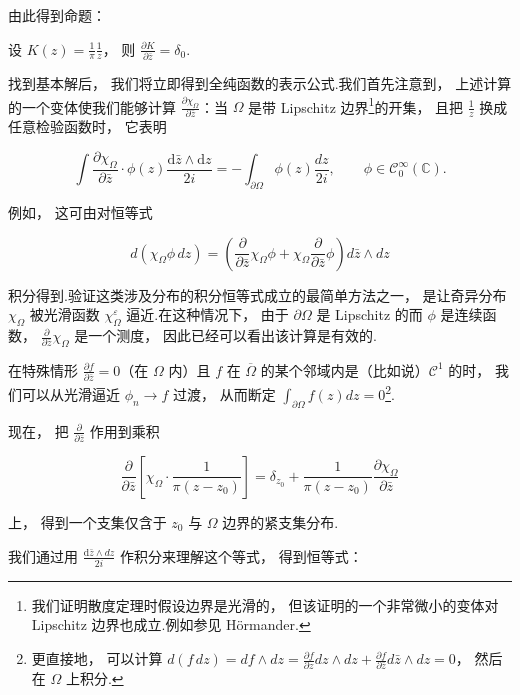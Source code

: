 由此得到命题：

\begin{proposition}\label{prop:c4-1.1}
设 $K(z) = \frac{1}{\pi}\frac{1}{z}$， 则 $\frac{\partial K}{\partial \bar{z}} = \delta_{0}$.
\end{proposition}

找到基本解后， 我们将立即得到全纯函数的表示公式.我们首先注意到， 上述计算的一个变体使我们能够计算 $\frac{\partial \chi_{\Omega}}{\partial \bar{z}}$：当 $\Omega$ 是带 Lipschitz 边界\footnote{我们证明散度定理时假设边界是光滑的， 但该证明的一个非常微小的变体对 Lipschitz 边界也成立.例如参见 Hörmander.}的开集， 且把 $\frac{1}{z}$ 换成任意检验函数时， 它表明

\[
\int \frac{\partial \chi_{\Omega}}{\partial \bar{z}} \cdot \phi(z)\frac{\mathrm{d}\bar{z} \wedge \mathrm{d}z}{2i} = -\int_{\partial\Omega}\phi(z)\frac{dz}{2i}, \qquad \phi \in \mathcal{C}_{0}^{\infty}(\mathbb{C}).
\]

例如， 这可由对恒等式

\[
d(\chi_{\Omega}\phi\, dz) = \left(\frac{\partial}{\partial \bar{z}}\chi_{\Omega}\phi + \chi_{\Omega}\frac{\partial}{\partial \bar{z}}\phi\right)d\bar{z} \wedge dz
\]

积分得到.验证这类涉及分布的积分恒等式成立的最简单方法之一， 是让奇异分布 $\chi_{\Omega}$ 被光滑函数 $\chi_{\Omega}^{\varepsilon}$ 逼近.在这种情况下， 由于 $\partial\Omega$ 是 Lipschitz 的而 $\phi$ 是连续函数， $\frac{\partial}{\partial \bar{z}}\chi_{\Omega}$ 是一个测度， 因此已经可以看出该计算是有效的.

在特殊情形 $\frac{\partial f}{\partial \bar{z}} = 0$（在 $\Omega$ 内）且 $f$ 在 $\overline{\Omega}$ 的某个邻域内是（比如说）$\mathcal{C}^{1}$ 的时， 我们可以从光滑逼近 $\phi_{n} \to f$ 过渡， 从而断定 $\int_{\partial\Omega}f(z)dz = 0$\footnote{更直接地， 可以计算 $d(f\, dz) = df \wedge dz = \frac{\partial f}{\partial z}dz \wedge dz + \frac{\partial f}{\partial \bar{z}}d\bar{z} \wedge dz = 0$， 然后在 $\Omega$ 上积分.}.

现在， 把 $\frac{\partial}{\partial \bar{z}}$ 作用到乘积

\[
\frac{\partial}{\partial \bar{z}}\left[\chi_{\Omega} \cdot \frac{1}{\pi(z-z_{0})}\right] = \delta_{z_{0}} + \frac{1}{\pi(z-z_{0})}\frac{\partial \chi_{\Omega}}{\partial \bar{z}}
\]

上， 得到一个支集仅含于 $z_{0}$ 与 $\Omega$ 边界的紧支集分布.

我们通过用 $\frac{\mathrm{d}\bar{z} \wedge dz}{2i}$ 作积分来理解这个等式， 得到恒等式：

